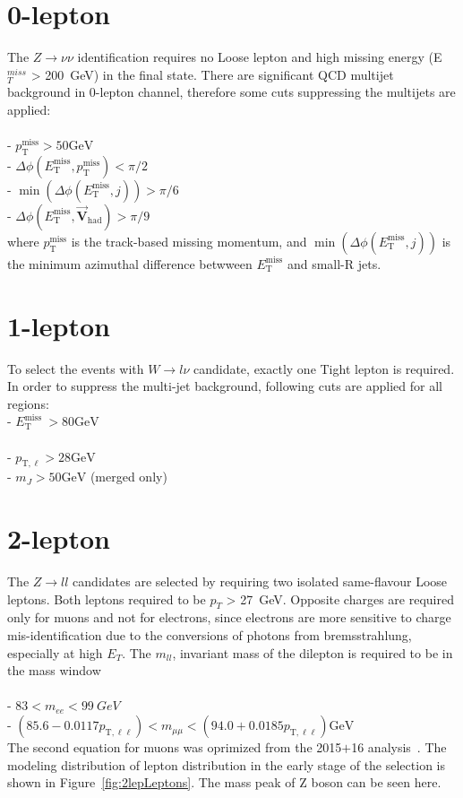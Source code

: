 \section{0-lepton}
The $Z \rightarrow \nu\nu$ identification requires no Loose lepton and high missing energy (E$_T^{miss}$ > 200~GeV) in the final state. There are significant QCD multijet background in 0-lepton channel, therefore some cuts suppressing the multijets are applied: \\
\\
- $p_{\mathrm{T}}^{\mathrm{miss}}>50 \mathrm{GeV}$ \\
- $\Delta \phi\left(E_{\mathrm{T}}^{\mathrm{miss}}, p_{\mathrm{T}}^{\mathrm{miss}}\right)<\pi / 2$ \\
- $\min \left(\Delta \phi\left(E_{\mathrm{T}}^{\mathrm{miss}}, j\right)\right)>\pi / 6$ \\
- $\Delta \phi\left(E_{\mathrm{T}}^{\mathrm{miss}}, \overrightarrow{\mathbf{V}}_{\mathrm{had}}\right)>\pi / 9$ \\
where $p_{\mathrm{T}}^{\mathrm{miss}}$ is the track-based missing momentum, and $\min \left(\Delta \phi\left(E_{\mathrm{T}}^{\mathrm{miss}}, j\right)\right)$ is the minimum azimuthal difference betwween $E_{\mathrm{T}}^{\mathrm{miss}}$ and small-R jets.

\section{1-lepton}
To select the events with $W \rightarrow l\nu$ candidate, exactly one Tight lepton is required.
In order to suppress the multi-jet background, following cuts are applied for all regions: \\
- $E_{\mathrm{T}}^{\text {miss }}>80 \mathrm{GeV}$ \\ \\
- $p_{\mathrm{T}, \ell}>28 \mathrm{GeV}$ \\
- $m_{J}>50 \mathrm{GeV}$ (merged only) \\

\section{2-lepton}
The $Z \rightarrow ll$ candidates are selected by requiring two isolated same-flavour Loose leptons. Both leptons required to be $p_T$ > 27~GeV. Opposite charges are required only for muons and not for electrons, since electrons are more sensitive to charge mis-identification due to the conversions of photons from bremsstrahlung, especially at high $E_T$.
The $m_{ll}$, invariant mass of the dilepton is required to be in the mass window \\ \\
- $83 < m_{ee}< 99~GeV$ \\ 
- $\left(85.6-0.0117 p_{\mathrm{T}, \ell \ell}\right)<m_{\mu \mu}<\left(94.0+0.0185 p_{\mathrm{T}, \ell \ell}\right) \mathrm{GeV}$ \\
The second equation for muons was oprimized from the 2015$\plus$16 analysis~\cite{}. 
The modeling distribution of lepton distribution in the early stage of the selection is shown in Figure~\ref{fig:2lepLeptons}. The mass peak of Z boson can be seen here.

